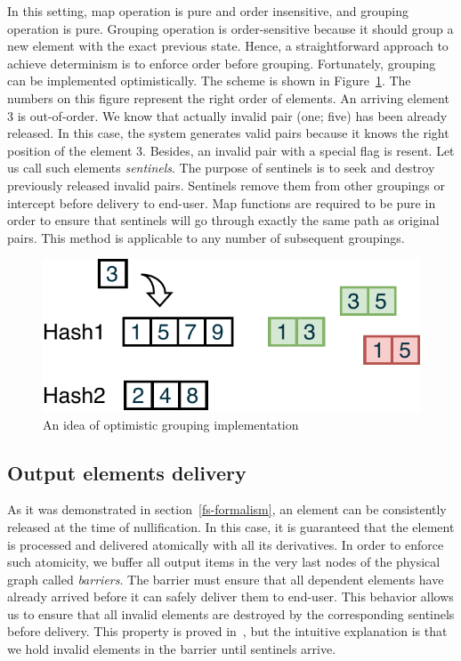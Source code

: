 In this setting, map operation is pure and order insensitive, and grouping operation is pure. Grouping operation is order-sensitive because it should group a new element with the exact previous state. Hence, a straightforward approach to achieve determinism is to enforce order before grouping. Fortunately, grouping can be implemented optimistically. The scheme is shown in Figure~\ref{optimistic-grouping}. The numbers on this figure represent the right order of elements. An arriving element 3 is out-of-order. We know that actually invalid pair (one; five) has been already released. In this case, the system generates valid pairs because it knows the right position of the element 3. Besides, an invalid pair with a special flag is resent. Let us call such elements {\em sentinels}. The purpose of sentinels is to seek and destroy previously released invalid pairs. Sentinels remove them from other groupings or intercept before delivery to end-user. Map functions are required to be pure in order to ensure that sentinels will go through exactly the same path as original pairs. This method is applicable to any number of subsequent groupings.
 
\begin{figure}[htbp]
  \centering
  \includegraphics[width=.35\textwidth]{pics/grouping-invalidation}
  \caption{An idea of optimistic grouping implementation}
  \label {optimistic-grouping}
\end{figure} 

\subsection{Output elements delivery}

As it was demonstrated in section~\ref{fs-formalism}, an element can be consistently released at the time of nullification. In this case, it is guaranteed that the element is processed and delivered atomically with all its derivatives. In order to enforce such atomicity, we buffer all output items in the very last nodes of the physical graph called {\em barriers}. The barrier must ensure that all dependent elements have already arrived before it can safely deliver them to end-user. This behavior allows us to ensure that all invalid elements are destroyed by the corresponding sentinels before delivery. This property is proved in~\cite{we2018adbis}, but the intuitive explanation is that we hold invalid elements in the barrier until sentinels arrive. 

